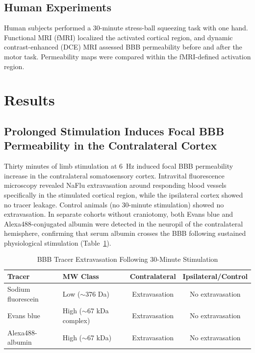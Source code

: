 \documentclass[11pt]{article}
\begin{document}
\subsection{Human Experiments}

Human subjects performed a 30-minute stress-ball squeezing task with one hand. Functional MRI (fMRI) localized the activated cortical region, and dynamic contrast-enhanced (DCE) MRI assessed BBB permeability before and after the motor task. Permeability maps were compared within the fMRI-defined activation region.

\section{Results}

\subsection{Prolonged Stimulation Induces Focal BBB Permeability in the Contralateral Cortex}

Thirty minutes of limb stimulation at 6~Hz induced focal BBB permeability increase in the contralateral somatosensory cortex. Intravital fluorescence microscopy revealed NaFlu extravasation around responding blood vessels specifically in the stimulated cortical region, while the ipsilateral cortex showed no tracer leakage. Control animals (no 30-minute stimulation) showed no extravasation. In separate cohorts without craniotomy, both Evans blue and Alexa488-conjugated albumin were detected in the neuropil of the contralateral hemisphere, confirming that serum albumin crosses the BBB following sustained physiological stimulation (Table~\ref{tab:tracers}).

\begin{table}[ht]
\centering
\caption{BBB Tracer Extravasation Following 30-Minute Stimulation}
\label{tab:tracers}
\begin{tabular}{llcc}
\toprule
\textbf{Tracer} & \textbf{MW Class} & \textbf{Contralateral} & \textbf{Ipsilateral/Control} \\
\midrule
Sodium fluorescein & Low ($\sim$376 Da) & Extravasation & No extravasation \\
Evans blue & High ($\sim$67 kDa complex) & Extravasation & No extravasation \\
Alexa488-albumin & High ($\sim$67 kDa) & Extravasation & No extravasation \\
\bottomrule
\end{tabular}
\end{table}
\end{document}
